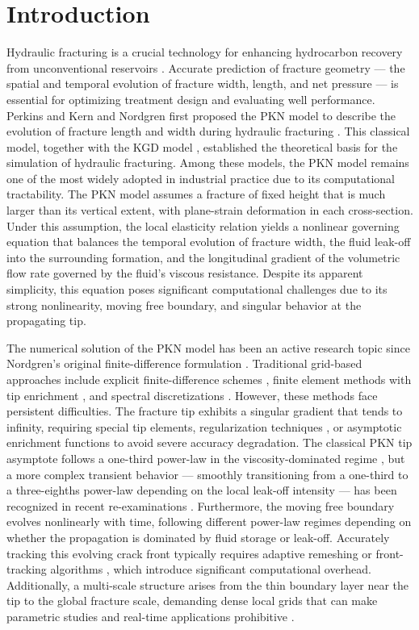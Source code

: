 \documentclass{ws-ijcm}
\begin{document}
\section{Introduction}

Hydraulic fracturing is a crucial technology for enhancing
hydrocarbon recovery from unconventional reservoirs
\cite{Economides2000}. Accurate prediction of fracture geometry ---
the spatial and temporal evolution of fracture width, length, and net
pressure --- is essential for optimizing treatment design and evaluating
well performance. Perkins and Kern and Nordgren first proposed the PKN
model to describe the evolution of fracture length and width during
hydraulic fracturing \cite{Nordgren1972}. This classical model, together
with the KGD model \cite{Ref_KGD}, established the theoretical basis for
the simulation of hydraulic fracturing. Among these models, the PKN
model remains one of the most widely adopted in industrial practice due
to its computational tractability. The PKN model assumes a fracture of
fixed height that is much larger than its vertical extent, with
plane-strain deformation in each cross-section. Under this assumption,
the local elasticity relation yields a nonlinear governing equation that
balances the temporal evolution of fracture width, the fluid leak-off
into the surrounding formation, and the longitudinal gradient of the
volumetric flow rate governed by the fluid's viscous resistance. Despite
its apparent simplicity, this equation poses significant computational
challenges due to its strong nonlinearity, moving free boundary, and
singular behavior at the propagating tip.

The numerical solution of the PKN model has been an active research
topic since Nordgren's original finite-difference formulation
\cite{Nordgren1972}. Traditional grid-based approaches include explicit
finite-difference schemes \cite{Kemp1990}, finite element methods with
tip enrichment \cite{Garikapati2017}, and spectral discretizations
\cite{Peirce2014}. However, these methods face persistent difficulties.
The fracture tip exhibits a singular gradient that tends to infinity,
requiring special tip elements, regularization techniques
\cite{Linkov2011}, or asymptotic enrichment functions
\cite{Garikapati2017} to avoid severe accuracy degradation. The
classical PKN tip asymptote follows a one-third power-law in the
viscosity-dominated regime \cite{Nordgren1972,Kemp1990}, but a more
complex transient behavior --- smoothly transitioning from a one-third
to a three-eighths power-law depending on the local leak-off intensity
--- has been recognized in recent re-examinations
\cite{Linkov2015,Detournay2016}. Furthermore, the moving free boundary
evolves nonlinearly with time, following different power-law regimes
depending on whether the propagation is dominated by fluid storage or
leak-off. Accurately tracking this evolving crack front typically
requires adaptive remeshing or front-tracking algorithms
\cite{Peirce2014}, which introduce significant computational overhead.
Additionally, a multi-scale structure arises from the thin boundary
layer near the tip to the global fracture scale, demanding dense local
grids that can make parametric studies and real-time applications
prohibitive \cite{Detournay2016}.
\end{document}
